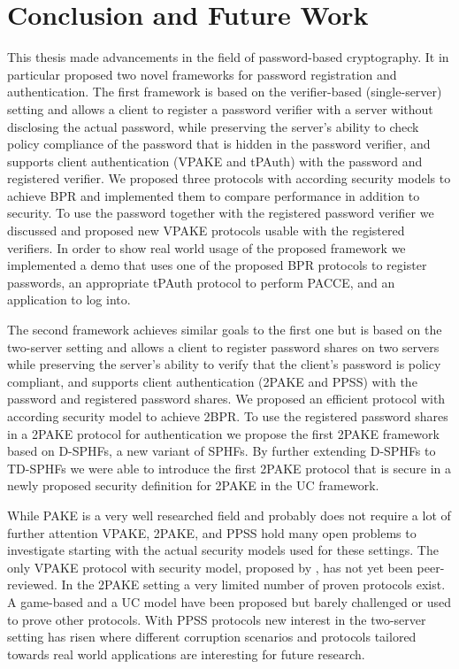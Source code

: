 \chapter{Conclusion and Future Work} \label{ch:conclusion}

This thesis made advancements in the field of password-based cryptography.
It in particular proposed two novel frameworks for password registration and authentication.
The first framework is based on the verifier-based (single-server) setting and allows a client to register a password verifier with a server without disclosing the actual password, while preserving the server's ability to check policy compliance of the password that is hidden in the password verifier, and supports client authentication (\ac{VPAKE} and \ac{tPAuth}) with the password and registered verifier.
We proposed three protocols with according security models to achieve \acl{BPR} and implemented them to compare performance in addition to security.
To use the password together with the registered password verifier we discussed and proposed new \ac{VPAKE} protocols usable with the registered verifiers.
In order to show real world usage of the proposed framework we implemented a demo that uses one of the proposed \ac{BPR} protocols to register passwords, an appropriate \ac{tPAuth} protocol to perform \acl{PACCE}, and an application to log into.

The second framework achieves similar goals to the first one but is based on the two-server setting and allows a client to register password shares on two servers while preserving the server's ability to verify that the client's password is policy compliant, and supports client authentication (\ac{2PAKE} and \ac{PPSS}) with the password and registered password shares.
We proposed an efficient protocol with according security model to achieve \acl{2BPR}.
To use the registered password shares in a \ac{2PAKE} protocol for authentication we propose the first \ac{2PAKE} framework based on \aclp{D-SPHF}, a new variant of \acp{SPHF}.
By further extending \acp{D-SPHF} to \acp{TD-SPHF} we were able to introduce the first \ac{2PAKE} protocol that is secure in a newly proposed security definition for \ac{2PAKE} in the \ac{UC} framework.

While \ac{PAKE} is a very well researched field and probably does not require a lot of further attention \ac{VPAKE}, \ac{2PAKE}, and \ac{PPSS} hold many open problems to investigate starting with the actual security models used for these settings.
The only \ac{VPAKE} protocol with security model, proposed by \citet{BenhamoudaP13}, has not yet been peer-reviewed.
In the \ac{2PAKE} setting a very limited number of proven protocols exist.
A game-based and a \ac{UC} model have been proposed but barely challenged or used to prove other protocols.
With \ac{PPSS} protocols new interest in the two-server setting has risen where different corruption scenarios and protocols tailored towards real world applications are interesting for future research.

